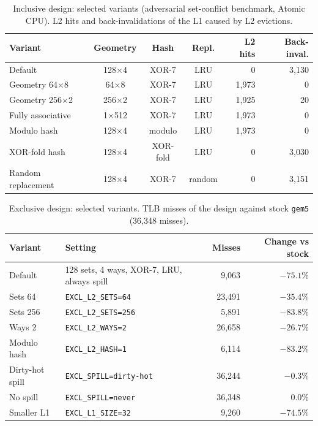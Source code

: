 \begin{table}[H]
\centering
\small
\caption{Inclusive design: selected variants (adversarial set-conflict benchmark, Atomic CPU). L2 hits and back-invalidations of the L1 caused by L2 evictions.}
\label{tab:sweep_inc}
\begin{tabular}{l c c c r r}
\toprule
\textbf{Variant} & \textbf{Geometry} & \textbf{Hash} & \textbf{Repl.} & \textbf{L2 hits} & \textbf{Back-inval.} \\
\midrule
Default & 128$\times$4 & XOR-7 & LRU & 0 & 3,130 \\
Geometry 64$\times$8 & 64$\times$8 & XOR-7 & LRU & 1,973 & 0 \\
Geometry 256$\times$2 & 256$\times$2 & XOR-7 & LRU & 1,925 & 20 \\
Fully associative & 1$\times$512 & XOR-7 & LRU & 1,973 & 0 \\
Modulo hash & 128$\times$4 & modulo & LRU & 1,973 & 0 \\
XOR-fold hash & 128$\times$4 & XOR-fold & LRU & 0 & 3,030 \\
Random replacement & 128$\times$4 & XOR-7 & random & 0 & 3,151 \\
\bottomrule
\end{tabular}
\end{table}

\begin{table}[H]
\centering
\small
\caption{Exclusive design: selected variants. TLB misses of the design against stock \texttt{gem5} (36,348 misses).}
\label{tab:sweep_excl}
\begin{tabular}{l l r r}
\toprule
\textbf{Variant} & \textbf{Setting} & \textbf{Misses} & \textbf{Change vs stock} \\
\midrule
Default & 128 sets, 4 ways, XOR-7, LRU, always spill & 9,063 & $-75.1\%$ \\
Sets 64 & \texttt{EXCL\_L2\_SETS=64} & 23,491 & $-35.4\%$ \\
Sets 256 & \texttt{EXCL\_L2\_SETS=256} & 5,891 & $-83.8\%$ \\
Ways 2 & \texttt{EXCL\_L2\_WAYS=2} & 26,658 & $-26.7\%$ \\
Modulo hash & \texttt{EXCL\_L2\_HASH=1} & 6,114 & $-83.2\%$ \\
Dirty-hot spill & \texttt{EXCL\_SPILL=dirty-hot} & 36,244 & $-0.3\%$ \\
No spill & \texttt{EXCL\_SPILL=never} & 36,348 & $0.0\%$ \\
Smaller L1 & \texttt{EXCL\_L1\_SIZE=32} & 9,260 & $-74.5\%$ \\
\bottomrule
\end{tabular}
\end{table}

